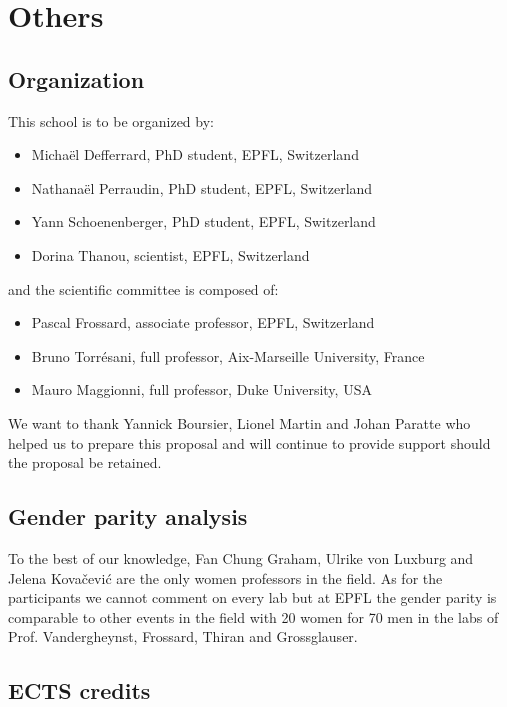 \documentclass[a4paper]{scrartcl}
\begin{document}
\section{Others}

\subsection{Organization}

This school is to be organized by:
\begin{itemize}
	\setlength{\itemsep}{0pt} \setlength{\parskip}{0pt}
	\item Michaël Defferrard, PhD student, EPFL, Switzerland
	\item Nathanaël Perraudin, PhD student, EPFL, Switzerland
	\item Yann Schoenenberger, PhD student, EPFL, Switzerland
	\item Dorina Thanou, scientist, EPFL, Switzerland
\end{itemize}
and the scientific committee is composed of:
\begin{itemize}
	\setlength{\itemsep}{0pt} \setlength{\parskip}{0pt}
	\item Pascal Frossard, associate professor, EPFL, Switzerland
	\item Bruno Torrésani, full professor, Aix-Marseille University, France
	\item Mauro Maggionni, full professor, Duke University, USA
\end{itemize}

We want to thank Yannick Boursier, Lionel Martin and Johan Paratte who helped us
to prepare this proposal and will continue to provide support should the
proposal be retained.

\subsection{Gender parity analysis}

To the best of our knowledge, Fan Chung Graham, Ulrike von Luxburg and Jelena
Kovačević are the only women professors in the field. As for the participants we
cannot comment on every lab but at EPFL the gender parity is comparable to other
events in the field with 20 women for 70 men in the labs of Prof. Vandergheynst,
Frossard, Thiran and Grossglauser.

\subsection{ECTS credits}
\end{document}
